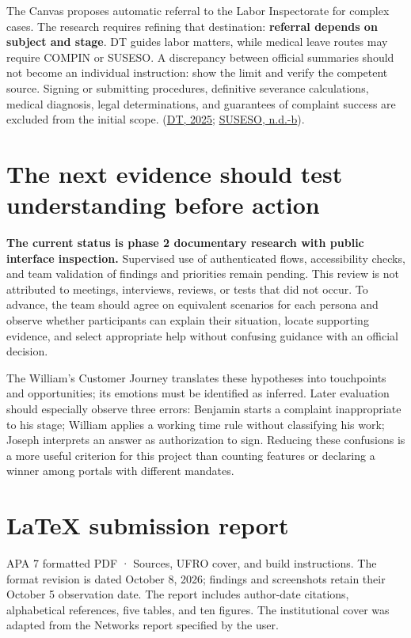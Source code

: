 The Canvas proposes automatic referral to the Labor Inspectorate for complex cases. The research requires refining that destination: \textbf{referral depends on subject and stage}. DT guides labor matters, while medical leave routes may require COMPIN or SUSESO. A discrepancy between official summaries should not become an individual instruction: show the limit and verify the competent source. Signing or submitting procedures, definitive severance calculations, medical diagnosis, legal determinations, and guarantees of complaint success are excluded from the initial scope. (\hyperref[ref:dt_licencias]{DT, 2025}; \hyperref[ref:su_compendio]{SUSESO, n.d.-b}).


\section{The next evidence should test understanding before action}

\textbf{The current status is phase 2 documentary research with public interface inspection.} Supervised use of authenticated flows, accessibility checks, and team validation of findings and priorities remain pending. This review is not attributed to meetings, interviews, reviews, or tests that did not occur. To advance, the team should agree on equivalent scenarios for each persona and observe whether participants can explain their situation, locate supporting evidence, and select appropriate help without confusing guidance with an official decision.


The William's Customer Journey translates these hypotheses into touchpoints and opportunities; its emotions must be identified as inferred. Later evaluation should especially observe three errors: Benjamin starts a complaint inappropriate to his stage; William applies a working time rule without classifying his work; Joseph interprets an answer as authorization to sign. Reducing these confusions is a more useful criterion for this project than counting features or declaring a winner among portals with different mandates.


\section{LaTeX submission report}

APA 7 formatted PDF · Sources, UFRO cover, and build instructions. The format revision is dated October 8, 2026; findings and screenshots retain their October 5 observation date. The report includes author-date citations, alphabetical references, five tables, and ten figures. The institutional cover was adapted from the Networks report specified by the user.


